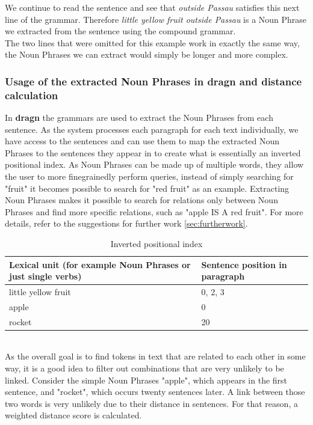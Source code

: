 We continue to read the sentence and see that \textit{outside Passau} satisfies this next line of the grammar. Therefore \textit{little yellow fruit outside Passau} is a Noun Phrase we extracted from the sentence using the compound grammar.\\
The two lines that were omitted for this example work in exactly the same way, the Noun Phrases we can extract would simply be longer and more complex.\\
\subsubsection{Usage of the extracted Noun Phrases in dragn and distance calculation}
In \textbf{dragn} the grammars are used to extract the Noun Phrases from each sentence. As the system processes each paragraph for each text individually, we have access to the sentences and can use them to map the extracted Noun Phrases to the sentences they appear in to create what is essentially an inverted positional index. As Noun Phrases can be made up of multiple words, they allow the user to more finegrainedly perform queries, instead of simply searching for "fruit" it becomes possible to search for "red fruit" as an example. Extracting Noun Phrases makes it possible to search for relations only between Noun Phrases and find more specific relations, such as "apple IS A red fruit". For more details, refer to the suggestions for further work \ref{sec:furtherwork}.
\begin{table}[h!]
\centering
\caption{Inverted positional index}
\label{table:inverted-posindex}
\begin{tabular}{l|l}
Lexical unit (for example Noun Phrases or just single verbs) & Sentence position in paragraph \\ \hline
little yellow fruit & 0, 2, 3 \\
apple & 0\\
rocket & 20\\
\end{tabular}
\end{table}
\\
As the overall goal is to find tokens in text that are related to each other in some way, it is a good idea to filter out combinations that are very unlikely to be linked. Consider the simple Noun Phrases "apple", which appears in the first sentence, and "rocket", which occurs twenty sentences later. A link between those two words is very unlikely due to their distance in sentences. For that reason, a weighted distance score is calculated.\\
